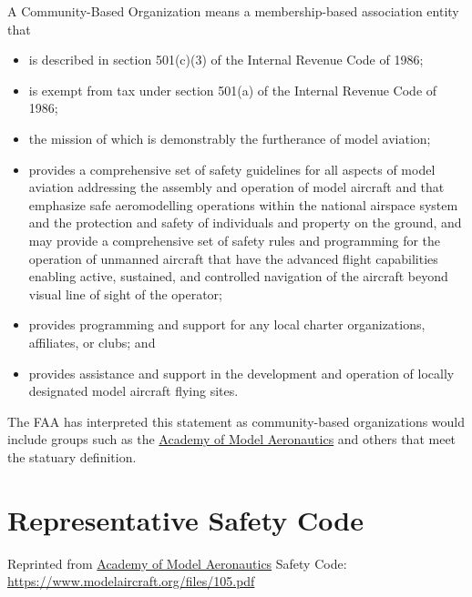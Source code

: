 \documentclass[
]{book}
\providecommand{\tightlist}{%
  \setlength{\itemsep}{0pt}\setlength{\parskip}{0pt}}
\begin{document}
A Community-Based Organization means a membership-based association entity that

\begin{itemize}
\tightlist
\item
  is described in section 501(c)(3) of the Internal Revenue Code of 1986;
\item
  is exempt from tax under section 501(a) of the Internal Revenue Code of 1986;
\item
  the mission of which is demonstrably the furtherance of model aviation;
\item
  provides a comprehensive set of safety guidelines for all aspects of model aviation addressing the assembly and operation of model aircraft and that emphasize safe aeromodelling operations within the national airspace system and the protection and safety of individuals and property on the ground, and may provide a comprehensive set of safety rules and programming for the operation of unmanned aircraft that have the advanced flight capabilities enabling active, sustained, and controlled navigation of the aircraft beyond visual line of sight of the operator;
\item
  provides programming and support for any local charter organizations, affiliates, or clubs; and
\item
  provides assistance and support in the development and operation of locally designated model aircraft flying sites.
\end{itemize}

The FAA has interpreted this statement as community-based organizations would include groups such as the \protect\hyperlink{AMA}{Academy of Model Aeronautics} and others that meet the statuary definition.

\hypertarget{s-safety-code}{%
\section{Representative Safety Code}\label{s-safety-code}}

Reprinted from \protect\hyperlink{AMA}{Academy of Model Aeronautics} Safety Code: \url{https://www.modelaircraft.org/files/105.pdf}
\end{document}
